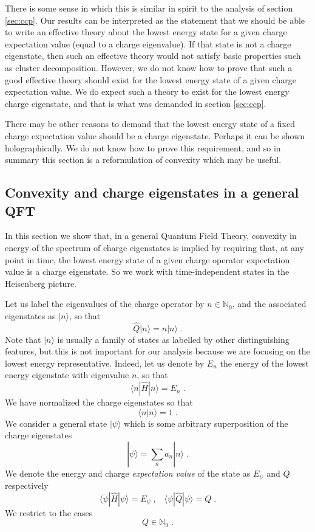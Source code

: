 \documentclass[11pt]{article}
\numberwithin{equation}{section}
\newcommand{\be}{\begin{equation}} \newcommand{\ee}{\end{equation}}
\begin{document}
 There is some sense in which this is similar in spirit to the analysis of section \ref{sec:ccp}. Our results can be interpreted as the statement that we should be able to write an effective theory about the lowest energy state for a given charge expectation value (equal to a charge eigenvalue). If that state is not a charge eigenstate, then such an effective theory would not satisfy basic properties such as cluster decomposition. However, we do not know how to prove that such a good effective theory should exist for the lowest energy state of a given charge expectation value. We do expect such a theory to exist for the lowest energy charge eigenstate, and that is what was demanded in section \ref{sec:ccp}.
 
 There may be other reasons to demand that the lowest energy state of a fixed charge expectation value should be a charge eigenstate. Perhaps it can be shown holographically. We do not know how to prove this requirement, and so in summary this section is a reformulation of convexity which may be useful. 

	\subsection{Convexity and charge eigenstates in a general QFT}
	\label{sec:conpure}

	In this section we show that, in a general Quantum Field Theory, convexity in energy of the spectrum of charge eigenstates is implied by requiring that, at any point in time, the lowest energy state of a given charge operator expectation value is a charge eigenstate. So we work with time-independent states in the Heisenberg picture. 
	
	Let us label the eigenvalues of the charge operator by $n \in \mathbb{N}_0$, and the associated eigenstates as $|n\rangle$, so that
	\be
	\hat{Q} |n\rangle = n |n\rangle \;.
	\ee 
	Note that $|n\rangle$ is usually a family of states as labelled by other distinguishing features, but this is not important for our analysis because we are focusing on the lowest energy representative. Indeed, let us denote by $E_n$ the energy of the lowest energy eigenstate with eigenvalue $n$, so that
	\be
	\langle n|\hat{H}|n\rangle = E_n \;. 
	\ee
	We have normalized the charge eigenstates so that
	\be
	\langle n | n \rangle = 1 \;.
	\ee
	We consider a general state $|\psi\rangle$ which is some arbitrary superposition of the charge eigenstates
	\be
	|\psi\rangle = \sum_n a_n |n\rangle \;.
	\ee
	We denote the energy and charge {\it expectation value} of the state as $E_{\psi}$ and $Q$ respectively
	\be
	\langle \psi|\hat{H}|\psi \rangle = E_{\psi} \;,\;\;\; \langle \psi|\hat{Q}|\psi\rangle = Q \;. 
	\ee
	We restrict to the cases 
	\be
	Q \in \mathbb{N}_0 \;.
	\ee
	
\end{document}
